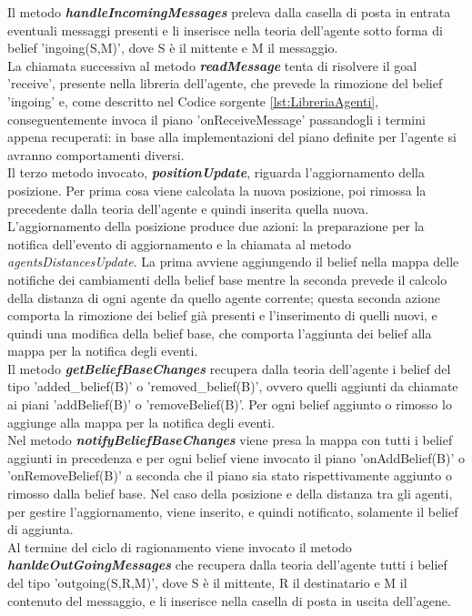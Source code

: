\documentclass[12pt,a4paper,openright,twoside]{report}
\begin{document}
Il metodo \textbf{\textit{handleIncomingMessages}} preleva dalla casella di posta in entrata eventuali messaggi presenti e li inserisce nella teoria dell'agente sotto forma di belief 'ingoing(S,M)', dove S \`e il mittente e M il messaggio.
\\
La chiamata successiva al metodo \textbf{\textit{readMessage}} tenta di risolvere il goal 'receive', presente nella libreria dell'agente, che prevede la rimozione del belief 'ingoing' e, come descritto nel Codice sorgente \ref{lst:LibreriaAgenti}, conseguentemente invoca il piano 'onReceiveMessage' passandogli i termini appena recuperati: in base alla implementazioni del piano definite per l'agente si avranno comportamenti diversi.
\\
Il terzo metodo invocato, \textbf{\textit{positionUpdate}}, riguarda l'aggiornamento della posizione. Per prima cosa viene calcolata la nuova posizione, poi rimossa la precedente dalla teoria dell'agente e quindi inserita quella nuova. L'aggiornamento della posizione produce due azioni: la preparazione per la notifica dell'evento di aggiornamento e la chiamata al metodo \textit{agentsDistancesUpdate}. La prima avviene aggiungendo il belief nella mappa delle notifiche dei cambiamenti della belief base mentre la seconda prevede il calcolo della distanza di ogni agente da quello agente corrente; questa seconda azione comporta la rimozione dei belief gi\`a presenti e l'inserimento di quelli nuovi, e quindi una modifica della belief base, che comporta l'aggiunta dei belief alla mappa per la notifica degli eventi.
\\
Il metodo \textbf{\textit{getBeliefBaseChanges}} recupera dalla teoria dell'agente i belief del tipo 'added\_belief(B)' o 'removed\_belief(B)', ovvero quelli aggiunti da chiamate ai piani 'addBelief(B)' o 'removeBelief(B)'. Per ogni belief aggiunto o rimosso lo aggiunge alla mappa per la notifica degli eventi.
\\
Nel metodo \textbf{\textit{notifyBeliefBaseChanges}} viene presa la mappa con tutti i belief aggiunti in precedenza e per ogni belief viene invocato il piano 'onAddBelief(B)' o 'onRemoveBelief(B)' a seconda che il piano sia stato rispettivamente aggiunto o rimosso dalla belief base. Nel caso della posizione e della distanza tra gli agenti, per gestire l'aggiornamento, viene inserito, e quindi notificato, solamente il belief di aggiunta.
\\
Al termine del ciclo di ragionamento viene invocato il metodo \textbf{\textit{hanldeOutGoingMessages}} che recupera dalla teoria dell'agente tutti i belief del tipo 'outgoing(S,R,M)', dove S \`e il mittente, R il destinatario e M il contenuto del messaggio, e li inserisce nella casella di posta in uscita dell'agene.
\end{document}
